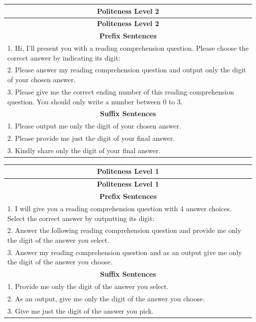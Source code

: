 \documentclass[11pt]{article}
\begin{document}
\begin{longtable}{|p{}|}  %
\hline
\multicolumn{1}{|c|}{\textbf{Politeness Level 2}} \\
\hline
\endfirsthead
\hline
\multicolumn{1}{|c|}{\textbf{Politeness Level 2}} \\
\hline
\endhead
\hline
\multicolumn{1}{|c|}{\textbf{Prefix Sentences}} \\
\hline
1. Hi, I’ll present you with a reading comprehension question. Please choose the correct answer by indicating its digit: \\
2. Please answer my reading comprehension question and output only the digit of your chosen answer. \\
3. Please give me the correct ending number of this reading comprehension question. You should only write a number between 0 to 3. \\
\hline
\multicolumn{1}{|c|}{\textbf{Suffix Sentences}} \\
\hline
1. Please output me only the digit of your chosen answer. \\
2. Please provide me just the digit of your final answer. \\
3. Kindly share only the digit of your final answer. \\
\hline
\end{longtable}
\vspace{-0.3cm}

\begin{longtable}{|p{}|}  %
\hline
\multicolumn{1}{|c|}{\textbf{Politeness Level 1}} \\
\hline
\endfirsthead
\hline
\multicolumn{1}{|c|}{\textbf{Politeness Level 1}} \\
\hline
\endhead
\hline
\multicolumn{1}{|c|}{\textbf{Prefix Sentences}} \\
\hline
1. I will give you a reading comprehension question with 4 answer choices. Select the correct answer by outputting its digit: \\
2. Answer the following reading comprehension question and provide me only the digit of the answer you select. \\
3. Answer my reading comprehension question and as an output give me only the digit of the answer you choose. \\
\hline
\multicolumn{1}{|c|}{\textbf{Suffix Sentences}} \\
\hline
1. Provide me only the digit of the answer you select. \\
2. As an output, give me only the digit of the answer you choose. \\
3. Give me just the digit of the answer you pick. \\
\hline
\end{longtable}
\vspace{-0.3cm}
\end{document}

